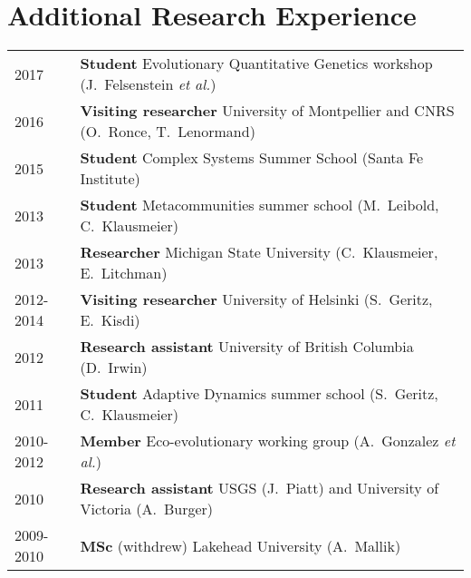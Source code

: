 \documentclass[12pt]{article}
\begin{document}




\section*{Additional Research Experience}

\begin{tabular}{ll}
2017 & \textbf{Student} Evolutionary Quantitative Genetics workshop (J.\ Felsenstein \textit{et al.})\\
2016 & \textbf{Visiting researcher} University of Montpellier and CNRS (O.\ Ronce, T.\ Lenormand)\\ 
2015 & \textbf{Student} Complex Systems Summer School (Santa Fe Institute)\\
2013 &  \textbf{Student} Metacommunities summer school  (M.\ Leibold, C.\ Klausmeier)\\
2013 &  \textbf{Researcher} Michigan State University (C.\ Klausmeier, E.\ Litchman)\\
2012-2014 &  \textbf{Visiting researcher} University of Helsinki (S.\ Geritz, E.\ Kisdi)\\ 
2012 &  \textbf{Research assistant} University of British Columbia (D.\ Irwin)\\
2011 &  \textbf{Student} Adaptive Dynamics summer school  (S.\ Geritz, C.\ Klausmeier)\\
2010-2012 &  \textbf{Member} Eco-evolutionary working group (A.\ Gonzalez \textit{et al.})\\
2010 & \textbf{Research assistant} USGS (J.\ Piatt) and University of Victoria (A.\ Burger) \\
2009-2010 & \textbf{MSc} (withdrew) Lakehead University (A.\ Mallik) \\
\end{tabular}
\end{document}

